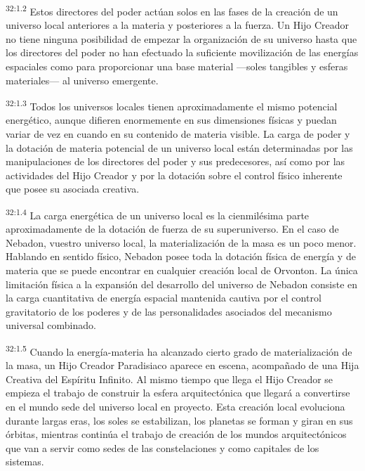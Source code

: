 \par
\textsuperscript{32:1.2} Estos directores del poder actúan solos en las fases de la creación de un universo local anteriores a la materia y posteriores a la fuerza. Un Hijo Creador no tiene ninguna posibilidad de empezar la organización de su universo hasta que los directores del poder no han efectuado la suficiente movilización de las energías espaciales como para proporcionar una base material ---soles tangibles y esferas materiales--- al universo emergente.

\par
\textsuperscript{32:1.3} Todos los universos locales tienen aproximadamente el mismo potencial energético, aunque difieren enormemente en sus dimensiones físicas y puedan variar de vez en cuando en su contenido de materia visible. La carga de poder y la dotación de materia potencial de un universo local están determinadas por las manipulaciones de los directores del poder y sus predecesores, así como por las actividades del Hijo Creador y por la dotación sobre el control físico inherente que posee su asociada creativa.

\par
\textsuperscript{32:1.4} La carga energética de un universo local es la cienmilésima parte aproximadamente de la dotación de fuerza de su superuniverso. En el caso de Nebadon, vuestro universo local, la materialización de la masa es un poco menor. Hablando en sentido físico, Nebadon posee toda la dotación física de energía y de materia que se puede encontrar en cualquier creación local de Orvonton. La única limitación física a la expansión del desarrollo del universo de Nebadon consiste en la carga cuantitativa de energía espacial mantenida cautiva por el control gravitatorio de los poderes y de las personalidades asociados del mecanismo universal combinado.

\par
\textsuperscript{32:1.5} Cuando la energía-materia ha alcanzado cierto grado de materialización de la masa, un Hijo Creador Paradisiaco aparece en escena, acompañado de una Hija Creativa del Espíritu Infinito. Al mismo tiempo que llega el Hijo Creador se empieza el trabajo de construir la esfera arquitectónica que llegará a convertirse en el mundo sede del universo local en proyecto. Esta creación local evoluciona durante largas eras, los soles se estabilizan, los planetas se forman y giran en sus órbitas, mientras continúa el trabajo de creación de los mundos arquitectónicos que van a servir como sedes de las constelaciones y como capitales de los sistemas.

